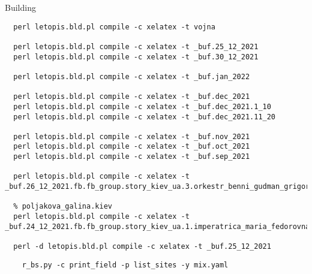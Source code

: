  
 
 
 
 
Building

\begin{verbatim}
  perl letopis.bld.pl compile -c xelatex -t vojna

  perl letopis.bld.pl compile -c xelatex -t _buf.25_12_2021
  perl letopis.bld.pl compile -c xelatex -t _buf.30_12_2021

  perl letopis.bld.pl compile -c xelatex -t _buf.jan_2022

  perl letopis.bld.pl compile -c xelatex -t _buf.dec_2021
  perl letopis.bld.pl compile -c xelatex -t _buf.dec_2021.1_10
  perl letopis.bld.pl compile -c xelatex -t _buf.dec_2021.11_20

  perl letopis.bld.pl compile -c xelatex -t _buf.nov_2021
  perl letopis.bld.pl compile -c xelatex -t _buf.oct_2021
  perl letopis.bld.pl compile -c xelatex -t _buf.sep_2021

  perl letopis.bld.pl compile -c xelatex -t _buf.26_12_2021.fb.fb_group.story_kiev_ua.3.orkestr_benni_gudman_grigorij_chapkis_1962

  % poljakova_galina.kiev
  perl letopis.bld.pl compile -c xelatex -t _buf.24_12_2021.fb.fb_group.story_kiev_ua.1.imperatrica_maria_fedorovna

  perl -d letopis.bld.pl compile -c xelatex -t _buf.25_12_2021

\end{verbatim}

\begin{verbatim}
	r_bs.py -c print_field -p list_sites -y mix.yaml
\end{verbatim}
